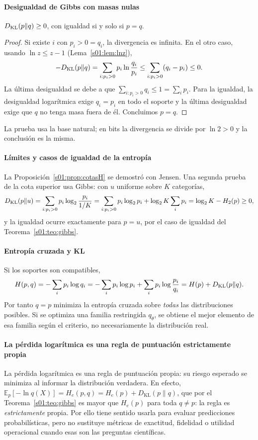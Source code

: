 \paragraph{Desigualdad de Gibbs con masas nulas}
\begin{teorema}\label{s01:teo:gibbs}
$D_{\rm KL}(p\|q)\ge0$, con igualdad si y solo si $p=q$.
\end{teorema}
\begin{proof}
Si existe $i$ con $p_i>0=q_i$, la divergencia es
infinita. En el otro caso, usando $\ln z\le z-1$ (Lema~\ref{s01:lem:lnz}),
\[
-D_{\rm KL}(p\|q)=\sum_{i:p_i>0}p_i\ln\frac{q_i}{p_i}
\le\sum_{i:p_i>0}(q_i-p_i)\le0.
\]
La última desigualdad se debe a que $\sum_{i:p_i>0}q_i\le1=\sum_ip_i$.
Para la igualdad, la desigualdad logarítmica exige $q_i=p_i$ en todo el
soporte y la última desigualdad exige que $q$ no tenga masa fuera de él.
Concluimos $p=q$.
\end{proof}
\noindent La prueba usa la base natural; en bits la divergencia se divide por
$\ln2>0$ y la conclusión es la misma.

\paragraph{Límites y casos de igualdad de la entropía}
La Proposición~\ref{s01:prop:cotasH} se demostró con Jensen. Una segunda prueba de
la cota superior usa Gibbs: con $u$ uniforme sobre $K$ categorías,
\[
D_{\rm KL}(p\|u)=\sum_{i:p_i>0}p_i\log_2\frac{p_i}{1/K}
=\sum_{i:p_i>0}p_i\log_2p_i+\log_2K\sum_ip_i=\log_2K-H_2(p)\ge0,
\]
y la igualdad ocurre exactamente para $p=u$, por el caso de igualdad del
Teorema~\ref{s01:teo:gibbs}.

\paragraph{Entropía cruzada y KL}
Si los soportes son compatibles,
\[
H(p,q)=-\sum_ip_i\log q_i
=-\sum_ip_i\log p_i+\sum_ip_i\log\frac{p_i}{q_i}
=H(p)+D_{\rm KL}(p\|q).
\]
Por tanto $q=p$ minimiza la entropía cruzada sobre \emph{todas} las
distribuciones posibles. Si se optimiza una familia restringida $q_\theta$,
se obtiene el mejor elemento de esa familia según el criterio, no
necesariamente la distribución real.

\paragraph{La pérdida logarítmica es una regla de puntuación estrictamente propia}
La pérdida logarítmica es una regla de puntuación propia: su riesgo
esperado se minimiza al informar la distribución verdadera.
En efecto, $\mathbb E_p[-\ln q(X)]=H_e(p,q)=H_e(p)+D_{\mathrm{KL}}(p\|q)$, que por
el Teorema~\ref{s01:teo:gibbs} es mayor que $H_e(p)$ para toda $q\ne p$: la regla es
\emph{estrictamente} propia. Por ello tiene sentido usarla para evaluar predicciones
probabilísticas, pero no sustituye métricas de exactitud, fidelidad o
utilidad operacional cuando esas son las preguntas científicas.

